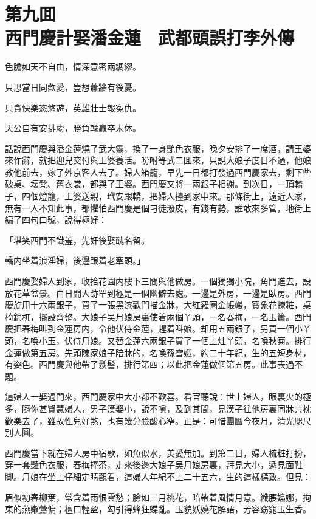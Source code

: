 
\chapter*{第九囬　\\西門慶計娶潘金蓮　武都頭誤打李外傳}


\begin{myquote}
色膽如天不自由，情深意密兩綢繆。

只思當日同歡愛，豈想蕭牆有後憂。

只貪快樂恣悠遊，英雄壯士報寃仇。

天公自有安排䖏，勝負輸贏卒未休。
\end{myquote}

話說西門慶與潘金蓮燒了武大靈，換了一身艷色衣服，晚夕安排了一席酒，請王婆來作辭，就把迎兒交付與王婆養活。吩咐等武二囬來，只說大娘子度日不過，他娘教他前去，嫁了外京客人去了。婦人箱籠，早先一日都打發過西門慶家去，剩下些破桌、壞凳、舊衣裳，都與了王婆。西門慶又將一兩銀子相謝。到次日，一頂轎子，四個燈籠，王婆送親，玳安跟轎，把婦人擡到家中來。那條街上，遠近人家，無有一人不知此事，都懼怕西門慶是個刁徒潑皮，有錢有勢，誰敢來多管，地街上編了四句口號，說得極好：
\begin{myquote}
「堪笑西門不識羞，先奸後娶醜名留。

轎内坐着浪淫婦，後邊跟着老牽頭。」
\end{myquote}

西門慶娶婦人到家，收拾花園内樓下三間與他做房。一個獨獨小院，角門進去，設放花草盆景。白日間人跡罕到極是一個幽僻去處。一邊是外房，一邊是臥房。西門慶旋用十六兩銀子，買了一張黑漆歡門描金牀，大紅羅圈金帳幔，寳象花揀粧，桌椅錦杌，擺設齊整。大娘子吴月娘房裏使着兩個丫頭，一名春梅，一名玉簫。西門慶把春梅叫到金蓮房内，令他伏侍金蓮，趕着呌娘。却用五兩銀子，另買一個小丫頭，名喚小玉，伏侍月娘。又替金蓮六兩銀子買了一個上灶丫頭，名喚秋菊。排行金蓮做第五房。先頭陳家娘子陪牀的，名喚孫雪娥，約二十年紀，生的五短身材，有姿色。西門慶與他帶了䯼髻，排行第四；以此把金蓮做個第五房。此事表過不題。

這婦人一娶過門來，西門慶家中大小都不歡喜。看官聽說：世上婦人，眼裏火的極多，隨你甚賢慧婦人，男子漢娶小，說不嗔，及到其間，見漢子往他房裏同牀共枕歡樂去了，雖故性兒好煞，也有幾分臉酸心窄。正是：可惜團圝今夜月，清光咫尺别人圓。

西門慶當下就在婦人房中宿歇，如魚似水，羙愛無加。到第二日，婦人梳粧打扮，穿一套豔色衣服，春梅捧茶，走來後邊大娘子吴月娘房裏，拜見大小，遞見面鞋脚。月娘在坐上仔細定睛觀看，這婦人年紀不上二十五六，生的這樣標致。但見：
\begin{myquote}
眉似初春柳葉，常含着雨恨雲愁；臉如三月桃花，暗帶着風情月意。纖腰嬝娜，拘束的燕嬾鶯慵；檀口輕盈，勾引得蜂狂蝶亂。玉貌妖嬈花解語，芳容窈窕玉生香。
\end{myquote}

